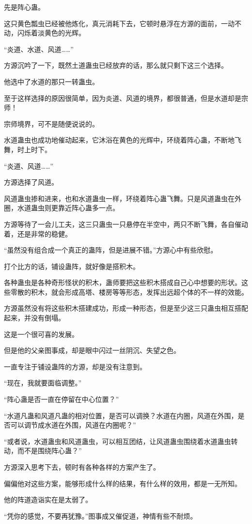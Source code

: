 \begin{this_body}
先是阵心蛊。

这只黄色瓢虫已经被他炼化，真元消耗下去，它顿时悬浮在方源的面前，一动不动，闪烁着淡黄色的光辉。

“炎道、水道、风道……”

方源沉吟了一下，既然土道蛊虫已经放弃的话，那么就只剩下这三个选择。

他选中了水道的那只一转蛊虫。

至于这样选择的原因很简单，因为炎道、风道的境界，都很普通，但是水道却是宗师！

宗师境界，可不是随便说说的。

水道蛊虫也成功地催动起来，它沐浴在黄色的光辉中，环绕着阵心蛊，不断地飞舞，时上时下。

“炎道、风道……”

方源选择了风道。

风道蛊虫掺和进来，也和水道蛊虫一样，环绕着阵心蛊飞舞。只是风道蛊虫在外圈，水道蛊虫则更靠近阵心蛊多一点。

方源等待了一会儿工夫，这三只蛊虫一只悬停在半空中，两只不断飞舞，各自催动着，还是非常的稳健。

“虽然没有组合成一个真正的蛊阵，但是进展不错。”方源心中有些欣慰。

打个比方的话，铺设蛊阵，就好像是搭积木。

各种蛊虫是各种奇形怪状的积木，蛊师要把这些积木搭成自己心中想要的形状。这些零散的积木，就会形成高塔、楼房等等形态，发挥出远超个体的不一样的效能。

方源虽然没有将这些积木搭建成功，形成一种形态，但是至少这三只蛊虫相互搭配起来，并没有倒塌。

这是一个很可喜的发展。

但是他的父亲图事成，却是眼中闪过一丝阴沉、失望之色。

一直专注于铺设蛊阵的方源，却是没有注意到。

“现在，我就要面临调整。”

“阵心蛊是否一直在停留在中心位置？”

“水道凡蛊和风道凡蛊的相对位置，是否可以调换？水道在内圈，风道在外围，是否可以调节成水道在外围，风道在内圈呢？”

“或者说，水道蛊虫和风道蛊虫，可以相互团结，让风道蛊虫围绕着水道蛊虫转动，而不是围绕阵心蛊？”

方源深入思考下去，顿时有各种各样的方案产生了。

偏偏他对这些方案，能够形成什么样的结果，有什么样的效用，都是一无所知。

他的阵道造诣实在是太弱了。

“凭你的感觉，不要再犹豫。”图事成又催促道，神情有些不耐烦。


\end{this_body}
